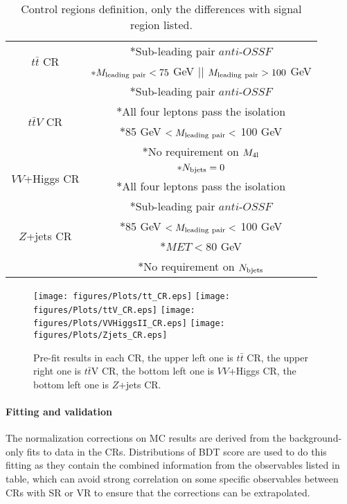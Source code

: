 \begin{table}[H]
\begin{center}
\caption{Control regions definition, only the differences with signal region listed.}
\label{Tab.CRs summary}
	\begin{tabular}{c|c}
		\toprule
		\toprule
		\multirow{2}{*}{$t\bar{t}$ CR}&$\ast$Sub-leading pair $anti$-$OSSF$\\
		&$\ast{M_{\rm leading\ pair}<75}$ GeV || $M_{\rm leading\ pair}>100$ GeV\\
		\midrule
		\multirow{4}{*}{$t\bar{t}V$ CR}&$\ast$Sub-leading pair $anti$-$OSSF$\\
		&$\ast$All four leptons pass the isolation\\
		&$\ast$85 GeV $<M_{\rm leading\ pair}<$ 100 GeV\\
		&$\ast$No requirement on $M_{\rm 4l}$\\
		\midrule
		\multirow{2}{*}{$VV$+Higgs CR}&$\ast{N_{\rm bjets}=0}$\\
		&$\ast$All four leptons pass the isolation\\
		\midrule
		\multirow{4}{*}{$Z$+jets CR}&$\ast$Sub-leading pair $anti$-$OSSF$\\
		&$\ast$85 GeV $<M_{\rm leading\ pair}<$ 100 GeV\\
		&$\ast{MET<80}$ GeV\\
		&$\ast$No requirement on $N_{\rm bjets}$\\
		\bottomrule
		\bottomrule
	\end{tabular}
\end{center}
\end{table}

\begin{figure}[H]
	\caption{Pre-fit results in each CR, the upper left one is $t\bar{t}$ CR, the upper right one is $t\bar{t}$V CR, the bottom left one is $VV$+Higgs CR, the bottom left one is $Z$+jets CR.}
	\label{Fig.CRs pre-fit}
	\centering
	\texttt{[image: figures/Plots/tt\_CR.eps]}
	\texttt{[image: figures/Plots/ttV\_CR.eps]}
	\texttt{[image: figures/Plots/VVHiggsII\_CR.eps]}
	\texttt{[image: figures/Plots/Zjets\_CR.eps]}
\end{figure}

\paragraph{Fitting and validation}

The normalization corrections on MC results are derived from the background-only fits to data in the CRs. Distributions of BDT score are used to do this fitting as they contain the combined information from the observables listed in table, which can avoid strong correlation on some specific observables between CRs with SR or VR to ensure that the corrections can be extrapolated.

